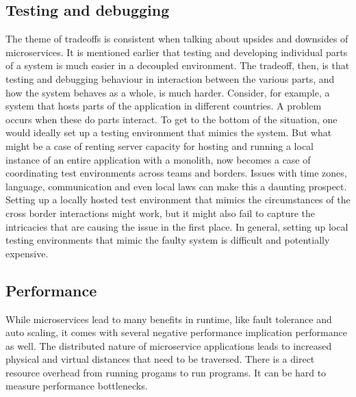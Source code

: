 \subsection{Testing and debugging}
The theme of tradeoffs is consistent when talking about upsides and downsides of microservices.
It is mentioned earlier that testing and developing individual parts of a system is much easier in a decoupled environment.
The tradeoff, then, is that testing and debugging behaviour in interaction between the various parts, and how the system behaves as a whole, is much harder.
Consider, for example, a system that hosts parts of the application in different countries. A problem occurs when these do parts interact.
To get to the bottom of the situation, one would ideally set up a testing environment that mimics the system.
But what might be a case of renting server capacity for hosting and running a local instance of an entire application with a monolith, now becomes a case of coordinating test environments across teams and borders. Issues with time zones, language, communication and even local laws can make this a daunting prospect.
Setting up a locally hosted test environment that mimics the circumstances of the cross border interactions might work, but it might also fail to capture the intricacies that are causing the issue in the first place.
In general, setting up local testing environments that mimic the faulty system is difficult and potentially expensive. \\

\subsection{Performance}
While microservices lead to many benefits in runtime, like fault tolerance and auto scaling, it comes with several negative performance implication performance as well.
The distributed nature of microservice applications leads to increased physical and virtual distances that need to be traversed.
There is a direct resource overhead from running progams to run programs.
It can be hard to measure performance bottlenecks.

